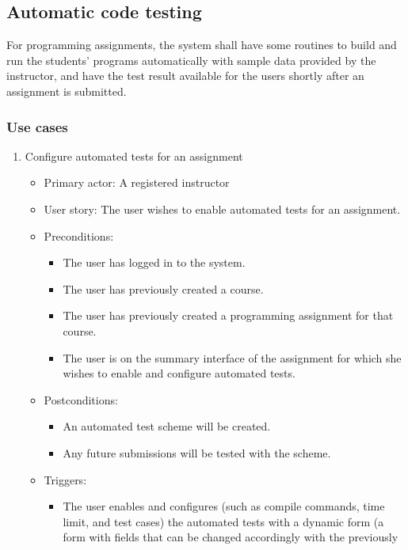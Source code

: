 \subsection{Automatic code testing}
For programming assignments, the system shall have some routines to build and
run the students' programs automatically with sample data provided by the
instructor, and have the test result available for the users shortly after an
assignment is submitted.

\subsubsection{Use cases}
\begin{enumerate}
\item Configure automated tests for an assignment
\begin{itemize}
    \item Primary actor: A registered instructor
    \item User story: The user wishes to enable automated tests for an
        assignment.
    \item Preconditions:
        \begin{itemize}
            \item The user has logged in to the system.
            \item The user has previously created a course.
            \item The user has previously created a programming assignment for
                that course.
            \item The user is on the summary interface of the assignment for
                which she wishes to enable and configure automated tests.
        \end{itemize}
    \item Postconditions:
        \begin{itemize}
            \item An automated test scheme will be created.
            \item Any future submissions will be tested with the scheme.
        \end{itemize}
    \item Triggers:
        \begin{itemize}
            \item The user enables and configures (such as compile commands, 
                time limit, and
                test cases) the automated tests with a dynamic form (a form
                with fields that can be changed accordingly with the previously

\end{itemize}
\end{itemize}
\end{enumerate}
